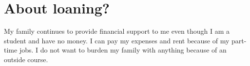 \section{About loaning?}

My family continues to provide financial support to me even though I am a student and have no money. I can pay my expenses and rent because of my part-time jobs. I do not want to burden my family with anything because of an outside course. 